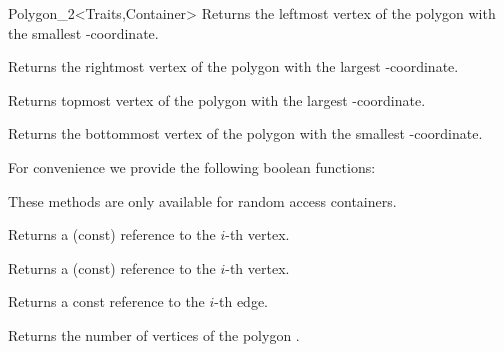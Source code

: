 \begin{ccClassTemplate}{Polygon_2<Traits,Container>}
    { Returns the leftmost vertex of the polygon  with the smallest
     -coordinate. }
    
    { Returns the rightmost vertex of the polygon  with the largest
     -coordinate. }
    
    { Returns topmost vertex of the polygon  with the largest
     -coordinate. }
    
    { Returns the bottommost vertex of the polygon  with the smallest
     -coordinate. }
    
\newpage
For convenience we provide the following boolean functions:    

    {}

\ccGlue
{}
    {}

\ccGlue
{}
    {}

\ccGlue
{}
    {}

\ccGlue
{}
    {}

\ccGlue
{}
    {}
  
\ccGlue
{}
    {}

\ccGlue
{}
    {}

These methods are only available for random access containers.

    { Returns a (const) reference to the $i$-th vertex. }

    { Returns a (const) reference to the $i$-th vertex. }

    { Returns a const reference to the $i$-th edge. }


    { Returns the number of vertices of the polygon \ccVar.}


\end{ccClassTemplate}

